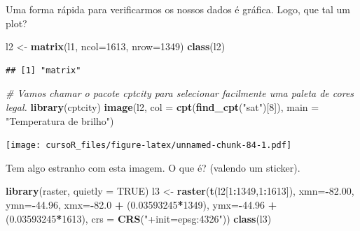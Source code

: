 \documentclass[]{book}
\newenvironment{Shaded}{\begin{snugshade}}{\end{snugshade}}
\newcommand{\KeywordTok}[1]{\textcolor[rgb]{0.13,0.29,0.53}{\textbf{#1}}}
\newcommand{\DataTypeTok}[1]{\textcolor[rgb]{0.13,0.29,0.53}{#1}}
\newcommand{\DecValTok}[1]{\textcolor[rgb]{0.00,0.00,0.81}{#1}}
\newcommand{\FloatTok}[1]{\textcolor[rgb]{0.00,0.00,0.81}{#1}}
\newcommand{\StringTok}[1]{\textcolor[rgb]{0.31,0.60,0.02}{#1}}
\newcommand{\CommentTok}[1]{\textcolor[rgb]{0.56,0.35,0.01}{\textit{#1}}}
\newcommand{\OtherTok}[1]{\textcolor[rgb]{0.56,0.35,0.01}{#1}}
\newcommand{\OperatorTok}[1]{\textcolor[rgb]{0.81,0.36,0.00}{\textbf{#1}}}
\newcommand{\NormalTok}[1]{#1}
\theoremstyle{definition}
\theoremstyle{definition}
\theoremstyle{definition}
\theoremstyle{remark}
\begin{document}
Uma forma rápida para verificarmos os nossos dados é gráfica. Logo, que
tal um plot?

\begin{Shaded}
\begin{Highlighting}[]
\NormalTok{l2 <-}\StringTok{ }\KeywordTok{matrix}\NormalTok{(l1, }\DataTypeTok{ncol=}\DecValTok{1613}\NormalTok{, }\DataTypeTok{nrow=}\DecValTok{1349}\NormalTok{)}
\KeywordTok{class}\NormalTok{(l2)}
\end{Highlighting}
\end{Shaded}

\begin{verbatim}
## [1] "matrix"
\end{verbatim}

\begin{Shaded}
\begin{Highlighting}[]
\CommentTok{# Vamos chamar o pacote cptcity para selecionar facilmente uma paleta de cores legal.}
\KeywordTok{library}\NormalTok{(cptcity)   }
\KeywordTok{image}\NormalTok{(l2,}
      \DataTypeTok{col =} \KeywordTok{cpt}\NormalTok{(}\KeywordTok{find_cpt}\NormalTok{(}\StringTok{"sat"}\NormalTok{)[}\DecValTok{8}\NormalTok{]),}
      \DataTypeTok{main =} \StringTok{"Temperatura de brilho"}\NormalTok{) }
\end{Highlighting}
\end{Shaded}

\texttt{[image: cursoR\_files/figure-latex/unnamed-chunk-84-1.pdf]}

Tem algo estranho com esta imagem. O que é? (valendo um sticker).

\begin{Shaded}
\begin{Highlighting}[]
\KeywordTok{library}\NormalTok{(raster, }\DataTypeTok{quietly =} \OtherTok{TRUE}\NormalTok{)}
\NormalTok{l3 <-}\StringTok{ }\KeywordTok{raster}\NormalTok{(}\KeywordTok{t}\NormalTok{(l2[}\DecValTok{1}\OperatorTok{:}\DecValTok{1349}\NormalTok{,}\DecValTok{1}\OperatorTok{:}\DecValTok{1613}\NormalTok{]),}
                     \DataTypeTok{xmn=}\OperatorTok{-}\FloatTok{82.00}\NormalTok{,}
                     \DataTypeTok{ymn=}\OperatorTok{-}\FloatTok{44.96}\NormalTok{,}
                     \DataTypeTok{xmx=}\OperatorTok{-}\FloatTok{82.0}  \OperatorTok{+}\StringTok{ }\NormalTok{(}\FloatTok{0.03593245}\OperatorTok{*}\DecValTok{1349}\NormalTok{), }
                     \DataTypeTok{ymx=}\OperatorTok{-}\FloatTok{44.96} \OperatorTok{+}\StringTok{ }\NormalTok{(}\FloatTok{0.03593245}\OperatorTok{*}\DecValTok{1613}\NormalTok{),}
                     \DataTypeTok{crs =} \KeywordTok{CRS}\NormalTok{(}\StringTok{"+init=epsg:4326"}\NormalTok{))}
\KeywordTok{class}\NormalTok{(l3)}
\end{Highlighting}
\end{Shaded}
\end{document}
